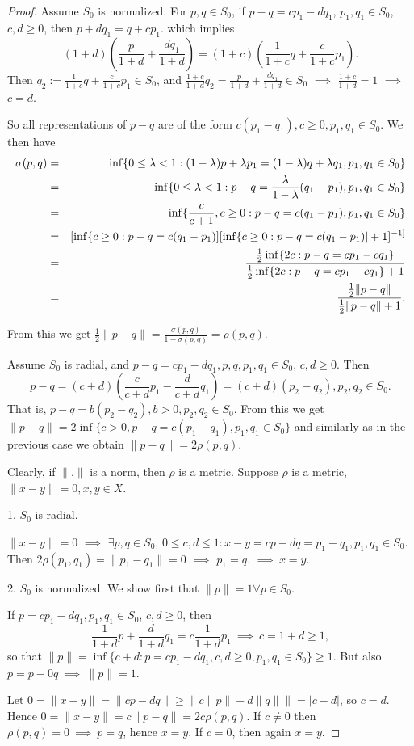 \documentclass[12pt,letterpaper]{article}
\begin{document}
\begin{proof} Assume $S_0$ is normalized. For $p,q\in S_0$, if $p-q=cp_1-dq_1$, $p_1,q_1\in S_0$, $c,d\geq 0$, then $p+dq_1=q+cp_1$. which implies
\[
(1+d)(\frac{p}{1+d}+\frac{dq_1}{1+d})=(1+c)(\frac{1}{1+c}q+\frac{c}{1+c}p_1).
\]
Then $q_2:=\frac{1}{1+c}q+\frac{c}{1+c}p_1\in S_0$, and  $\frac{1+c}{1+d}q_2=\frac{p}{1+d}+\frac{dq_1}{1+d}\in S_0$  $\implies$ $\frac{1+c}{1+d}=1$ $\implies$ $c=d$.

So all representations of $p-q$ are of the form $c(p_1-q_1), c\geq 0, p_1,q_1\in S_0$. We then have
\begin{eqnarray*} \sigma(p,q)&=&\inf \{ 0\leq \lambda <1: (1-\lambda)p+\lambda p_1=(1-\lambda)q+\lambda q_1, p_1,q_1\in S_0\}\\
&=&\inf\{ 0\leq \lambda <1: p-q=\frac{\lambda}{1-\lambda}(q_1-p_1),p_1,q_1\in S_0\}\\
&=& \inf\{ \frac{c}{c+1},c\geq 0: p-q=c(q_1-p_1), p_1,q_1\in S_0\}\\
&=&[\inf\{ c\geq 0:p-q=c(q_1-p_1)][\inf\{ c\geq 0: p-q=c(q_1-p_1)|}+1]^{-1]\\
&=&\frac{\frac{1}{2}\inf\{2c: p-q=cp_1-cq_1\}}{\frac{1}{2}\inf\{ 2c: p-q=cp_1-cq_1\}+1}\\
&=&\frac{\frac{1}{2}\|p-q\|}{\frac{1}{2}\|p-q\|+1}.
\end{eqnarray*}

From this we get
$ \frac{1}{2}\|p-q\|=\frac{\sigma(p,q)}{1-\sigma(p,q)}=\rho(p,q)$.

Assume $S_0$ is radial, and $p-q=cp_1-dq_1, p,q,p_1,q_1\in S_0$, $c,d\geq 0$. Then
\[ p-q=(c+d)(\frac{c}{c+d}p_1-\frac{d}{c+d}q_1)=(c+d)(p_2-q_2), p_2,q_2\in S_0.
\]
That is, $p-q=b(p_2-q_2), b>0, p_2,q_2\in S_0$. From this we get $\|p-q\|=2\inf\{ c>0, p-q=c(p_1-q_1), p_1,q_1\in S_0\}$ and similarly as in the previous case we obtain
$\|p-q\|=2\rho(p,q)$.

Clearly, if $\|.\|$ is a norm, then $\rho$ is a metric. Suppose $\rho$ is a metric, $\|x-y\|=0, x,y\in X$.

1. $S_0$ is radial.

$\|x-y\|=0$ $\implies$ $\exists p,q\in S_0$, $0\leq c,d\leq 1: x-y=cp-dq=p_1-q_1, p_1,q_1\in S_0$. Then $2\rho(p_1,q_1)=\|p_1-q_1\|=0$ $\implies$ $p_1=q_1\ \implies \ x=y$.

2. $S_0$ is normalized. We show first that $\|p\|=1 \forall p\in S_0$.

If $p=cp_1-dq_1, p_1,q_1\in S_0$, $c,d\geq 0$, then
\[
\frac{1}{1+d}p+\frac{d}{1+d}q_1=c\frac{1}{1+d}p_1\ \implies \ c=1+d \geq 1,
\]
so that $\|p\| =\inf\{ c+d : p=cp_1-dq_1, c,d\geq 0, p_1,q_1\in S_0\}\geq 1$. But also $p=p-0q \ \implies \ \|p\|=1$.

Let $0=\|x-y\|=\|cp-dq\|\geq \|c\|p\|-d\|q\|\|=|c-d|$, so $c=d$. Hence $0=\|x-y\|=c\|p-q\|=2c\rho(p,q)$. If $c\neq 0$ then $\rho(p,q)=0 \ \implies \ p=q$, hence $x=y$.
If $c=0$, then again $x=y$.
\end{proof}
\end{document}
